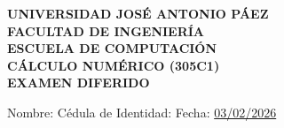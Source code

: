 \documentclass[12pt, letterpaper]{article}
\begin{document}
\begin{center}
    \textbf{\uppercase{Universidad José Antonio Páez}}\\
    \textbf{\uppercase{Facultad de Ingeniería}}\\
    \textbf{\uppercase{Escuela de Computación}}\\[1em]

    \textbf{\uppercase{Cálculo Numérico (305C1)}}\\    
    \textbf{\uppercase{Examen Diferido}}\\[1em]
\end{center}

\vspace{0.5cm}

Nombre: \underline{\hspace{7cm}}Cédula de Identidad: \underline{\hspace{4cm}}
Fecha: \underline{03/02/2026}\\
\end{document}
